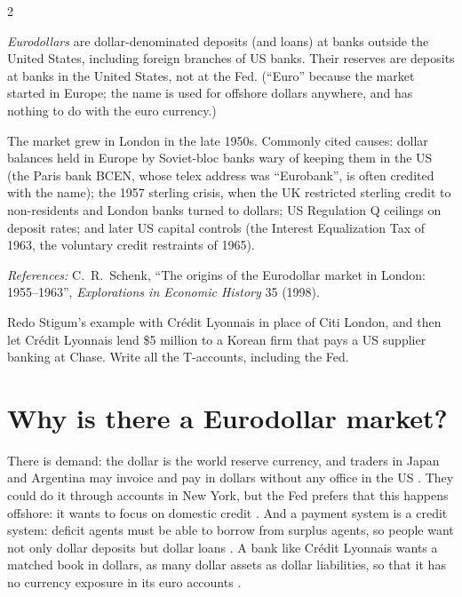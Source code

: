 \begin{paracol}{2}
\begin{definition}\label{def:ed}
\emph{Eurodollars} are dollar-denominated deposits (and loans) at banks outside the United States, including foreign branches of US banks. Their reserves are deposits at
banks in the United States, not at the Fed. (``Euro'' because the market started in Europe; the name is used for offshore dollars anywhere, and has nothing to do with the
euro currency.)
\end{definition}\begin{history}
The market grew in London in the late 1950s. Commonly cited causes: dollar balances held in Europe by Soviet-bloc banks wary of keeping them in the US (the Paris bank BCEN,
whose telex address was ``Eurobank'', is often credited with the name); the 1957 sterling crisis, when the UK restricted sterling credit to non-residents and London banks
turned to dollars; US Regulation Q ceilings on deposit rates; and later US capital controls (the Interest Equalization Tax of 1963, the voluntary credit restraints of 1965).\par
\emph{References:} C.~R.~Schenk, ``The origins of the Eurodollar market in London: 1955--1963'', \emph{Explorations in Economic History} 35 (1998).
\end{history}

\begin{exercise}
Redo Stigum's example with Crédit Lyonnais in place of Citi London, and then let Crédit Lyonnais lend \$5 million to a Korean firm that pays a US supplier banking at Chase. Write all the
T-accounts, including the Fed.
\end{exercise}

\section{Why is there a Eurodollar market?}\label{sec:ed-why}
There is demand: the dollar is the world reserve currency, and traders in Japan and Argentina may invoice and pay in dollars without any office in the US
. They could do it through accounts in New York, but the Fed prefers that this happens offshore: it wants to focus on domestic credit
. And a payment system is a credit system: deficit agents must be able to borrow from surplus agents, so people want not only dollar deposits but dollar loans
. A bank like Crédit Lyonnais wants a matched book in dollars, as many dollar assets as dollar liabilities, so that it has no currency exposure in
its euro accounts .


\end{paracol}
